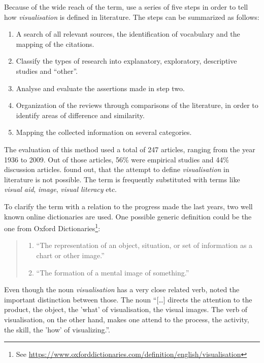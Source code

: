 Because of the wide reach of the term, \citeauthor{Phillips2010} use a series of five steps in order to tell how \textit{visualisation} is defined in literature. The steps can be summarized as follows:
\begin{enumerate}
\item A search of all relevant sources, the identification of vocabulary and the mapping of the citations.
\item Classify the types of research into explanatory, exploratory, descriptive studies and ``other''.
\item Analyse and evaluate the assertions made in step two.
\item Organization of the reviews through comparisons of the literature, in order to identify areas of difference and similarity.
\item Mapping the collected information on several categories.
\end{enumerate}
The evaluation of this method used a total of 247 articles, ranging from the year 1936 to 2009. Out of those articles, 56\% were empirical studies and 44\% discussion articles. \citeauthor{Phillips2010} found out, that the attempt to define \textit{visualisation} in literature is not possible. The term is frequently substituted with terms like \textit{visual aid}, \textit{image}, \textit{visual literacy} etc.

To clarify the term with a relation to the progress made the last years, two well known online dictionaries are used. One possible generic definition could be the one from Oxford Dictionaries\footnote{See \href{https://www.oxforddictionaries.com/definition/english/visualisation}{https://www.oxforddictionaries.com/definition/english/visualisation}}:

\begin{quote}
\begin{enumerate}
\item ``The representation of an object, situation, or set of information as a chart or other image.''
\item ``The formation of a mental image of something.''
\end{enumerate}
\end{quote}

Even though the noun \textit{visualisation} has a very close related verb, \citeauthor{Phillips2010} noted the important distinction between those. The noun ``[\ldots] directs the attention to the product, the object, the 'what' of visualisation, the visual images. The verb of visualisation, on the other hand, makes one attend to the process, the activity, the skill, the 'how' of visualizing.''.

